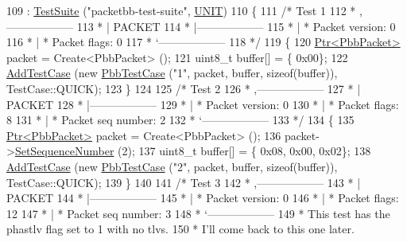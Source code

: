 \begin{DoxyCode}
109   : \hyperlink{classns3_1_1TestSuite_a904b0c40583b744d30908aeb94636d1a}{TestSuite} (\textcolor{stringliteral}{"packetbb-test-suite"}, \hyperlink{classns3_1_1TestSuite_a1ebfcab34ec8161e085e8e3a1855eae0a3885375a3787abf60431f8454b3cadbd}{UNIT})
110 \{
111   \textcolor{comment}{/* Test 1}
112 \textcolor{comment}{   *    ,------------------}
113 \textcolor{comment}{   *    |  PACKET}
114 \textcolor{comment}{   *    |------------------}
115 \textcolor{comment}{   *    | * Packet version:    0}
116 \textcolor{comment}{   *    | * Packet flags:  0}
117 \textcolor{comment}{   *    `------------------}
118 \textcolor{comment}{   */}
119   \{
120     \hyperlink{classns3_1_1Ptr}{Ptr<PbbPacket>} packet = Create<PbbPacket> ();
121     uint8\_t buffer[] = \{ 0x00\};
122     \hyperlink{classns3_1_1TestCase_a3718088e3eefd5d6454569d2e0ddd835}{AddTestCase} (\textcolor{keyword}{new} \hyperlink{classPbbTestCase}{PbbTestCase} (\textcolor{stringliteral}{"1"}, packet, buffer, \textcolor{keyword}{sizeof}(buffer)), 
      TestCase::QUICK);
123   \}
124 
125   \textcolor{comment}{/* Test 2}
126 \textcolor{comment}{   * ,------------------}
127 \textcolor{comment}{   * |  PACKET}
128 \textcolor{comment}{   * |------------------}
129 \textcolor{comment}{   * | * Packet version:    0}
130 \textcolor{comment}{   * | * Packet flags:  8}
131 \textcolor{comment}{   * | * Packet seq number: 2}
132 \textcolor{comment}{   * `------------------}
133 \textcolor{comment}{   */}
134   \{
135     \hyperlink{classns3_1_1Ptr}{Ptr<PbbPacket>} packet = Create<PbbPacket> ();
136     packet->\hyperlink{classns3_1_1PbbPacket_a7d6a1602be86109760d0f26ff9bbbb8e}{SetSequenceNumber} (2);
137     uint8\_t buffer[] = \{ 0x08, 0x00, 0x02\};
138     \hyperlink{classns3_1_1TestCase_a3718088e3eefd5d6454569d2e0ddd835}{AddTestCase} (\textcolor{keyword}{new} \hyperlink{classPbbTestCase}{PbbTestCase} (\textcolor{stringliteral}{"2"}, packet, buffer, \textcolor{keyword}{sizeof}(buffer)), 
      TestCase::QUICK);
139   \}
140 
141   \textcolor{comment}{/* Test 3}
142 \textcolor{comment}{   * ,------------------}
143 \textcolor{comment}{         * |  PACKET}
144 \textcolor{comment}{         * |------------------}
145 \textcolor{comment}{         * | * Packet version:    0}
146 \textcolor{comment}{         * | * Packet flags:  12}
147 \textcolor{comment}{         * | * Packet seq number: 3}
148 \textcolor{comment}{         * `------------------}
149 \textcolor{comment}{   * This test has the phastlv flag set to 1 with no tlvs.}
150 \textcolor{comment}{   * I'll come back to this one later.}

\end{DoxyCode}
